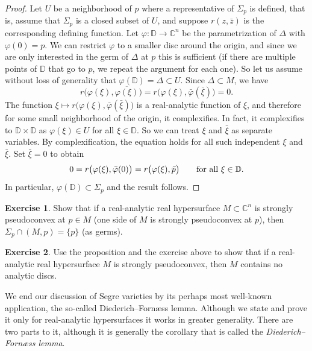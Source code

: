 \documentclass[12pt,openany]{book}
\newcommand{\avoidbreak}{\postdisplaypenalty=100}
\newcommand{\C}{{\mathbb{C}}}
\newcommand{\D}{{\mathbb{D}}}
\newcommand{\myindex}[1]{#1\index{#1}}
\theoremstyle{plain}
\theoremstyle{remark}
\theoremstyle{definition}
\newenvironment{exbox}{%
    \def\FrameCommand{\vrule width 1pt \relax\hspace{10pt}}%
    \MakeFramed{\advance\hsize-\width\FrameRestore}%
}{%
    \endMakeFramed
}
\theoremstyle{exercise}
\newtheorem{exercise}{Exercise}[section]
\theoremstyle{example}
\begin{document}
\begin{proof}
Let $U$ be a neighborhood of $p$ where a representative
of $\Sigma_p$ is defined, that is, assume that $\Sigma_p$ is
a closed subset of $U$, and suppose $r(z,\bar{z})$ is the corresponding
defining function.
Let $\varphi \colon \D \to \C^n$ be the parametrization of $\Delta$
with $\varphi(0) = p$.  We can restrict $\varphi$ to a smaller disc around the
origin, and since we are only interested in the germ of $\Delta$ at $p$ this
is sufficient (if there are multiple points of $\D$
that go to $p$, we repeat the argument for each one).
So let us assume without loss of generality that $\varphi(\D) = \Delta \subset U$.
Since $\Delta \subset M$, we have
\begin{equation*}
r\bigl(\varphi(\xi),\overline{\varphi(\xi)}\bigr) =
r\bigl(\varphi(\xi),\bar{\varphi}(\bar{\xi})\bigr) = 0 .
\end{equation*}
The function $\xi \mapsto
r\bigl(\varphi(\xi),\bar{\varphi}(\bar{\xi})\bigr)$ is a real-analytic
function of $\xi$, and therefore for some
small neighborhood of the origin, it complexifies.  In fact, it complexifies
to $\D \times \D$ as $\varphi(\xi) \in U$ for all $\xi \in \D$.
So we can treat $\xi$ and $\bar{\xi}$ as separate variables.  By
complexification, the equation holds for all such independent
$\xi$ and $\bar{\xi}$.  Set $\bar{\xi} = 0$ to obtain
\begin{equation*}
0 =
r\bigl(\varphi(\xi),\bar{\varphi}(0)\bigr) =
r\bigl(\varphi(\xi),\bar{p}\bigr)
\qquad \text{for all $\xi \in \D$}.
\avoidbreak
\end{equation*}
In particular, $\varphi(\D) \subset \Sigma_p$ and the result follows.
\end{proof}

\begin{exbox}
\begin{exercise}
Show that if a real-analytic real hypersurface $M \subset \C^n$ is strongly
pseudoconvex at $p \in M$ (one side of $M$ is strongly pseudoconvex at $p$),
then $\Sigma_p \cap
(M,p) = \{p\}$ (as germs).
\end{exercise}

\begin{exercise}
Use the proposition and the exercise above to show that if a real-analytic
real hypersurface $M$ is strongly
pseudoconvex, then $M$ contains no analytic discs.
\end{exercise}
\end{exbox}

We end our discussion of Segre varieties by its perhaps most well-known
application, the so-called Diederich--Forn\ae ss lemma.  Although
we state and prove it only for real-analytic hypersurfaces it works in greater generality.
There are two parts to it, although it is generally the corollary
that is called the \emph{\myindex{Diederich--Forn\ae ss lemma}}.
\end{document}
